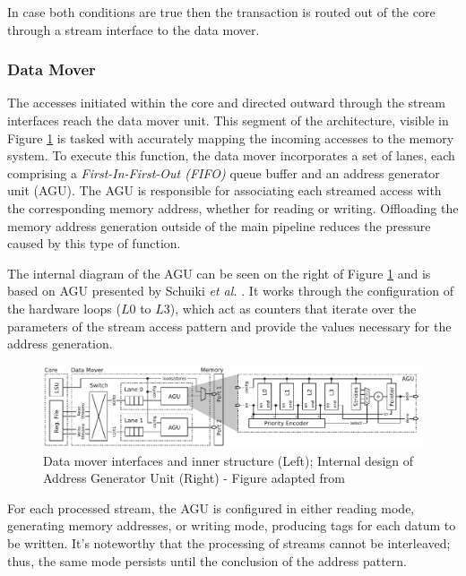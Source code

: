 In case both conditions are true then the transaction is routed out of the core through a stream interface to the data mover.

\subsubsection{Data Mover}

The accesses initiated within the core and directed outward through the stream interfaces reach the data mover unit. This segment of the architecture, visible in Figure \ref{fig:ssr-data_mover} is tasked with accurately mapping the incoming accesses to the memory system. To execute this function, the data mover incorporates a set of lanes, each comprising a \textit{First-In-First-Out (FIFO)} queue buffer and an address generator unit (AGU). The AGU is responsible for associating each streamed access with the corresponding memory address, whether for reading or writing. Offloading the memory address generation outside of the main pipeline reduces the pressure caused by this type of function.

The internal diagram of the AGU can be seen on the right of Figure \ref{fig:ssr-data_mover} and is based on AGU presented by Schuiki \textit{et al.} \cite{8502059}. It works through the configuration of the hardware loops ($L0$ to $L3$), which act as counters that iterate over the parameters of the stream access pattern and provide the values necessary for the address generation. 

\begin{figure}[H]
	\begin{center}
 		\includegraphics[width=0.87\linewidth]{images/ssr-data_mover.pdf}
 		\caption{Data mover interfaces and inner structure (Left); Internal design of Address Generator Unit (Right) - Figure adapted from \cite{9068465}}
 		\label{fig:ssr-data_mover}
	\end{center} 
\end{figure}

For each processed stream, the AGU is configured in either reading mode, generating memory addresses, or writing mode, producing tags for each datum to be written. It's noteworthy that the processing of streams cannot be interleaved; thus, the same mode persists until the conclusion of the address pattern.


